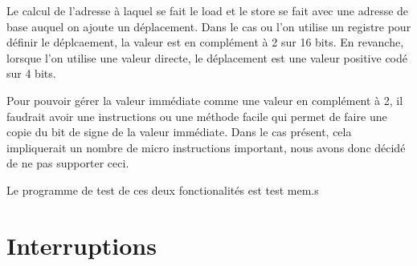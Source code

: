 \documentclass{myArticle}
\begin{document}
Le calcul de l'adresse à laquel se fait le load et le store se fait avec une adresse de base auquel
on ajoute un déplacement. Dans le cas ou l'on utilise un registre pour définir le déplcaement, la
valeur est en complément à 2 sur 16 bits. En revanche, lorsque l'on utilise une valeur directe, le
déplacement est une valeur positive codé sur 4 bits.

Pour pouvoir gérer la valeur immédiate comme une valeur en complément à 2, il faudrait avoir une
instructions ou une méthode facile qui permet de faire une copie du bit de signe de la valeur
immédiate. Dans le cas présent, cela impliquerait un nombre de micro instructions important, nous
avons donc décidé de ne pas supporter ceci.

Le programme de test de ces deux fonctionalités est test mem.s

\section{Interruptions}
\end{document}
